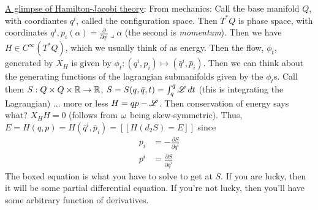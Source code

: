  \underline{A glimpse of Hamilton-Jacobi theory}:  From mechanics:
 Call the base manifold $Q$, with coordiantes $q^i$, called the
 configuration space.  Then $T^*Q$ is phase space, with
 coordinates $q^i, p_i(\alpha) = \frac{\partial}{\partial
 q^i}\lrcorner \alpha$ (the second is \emph{momentum}).  Then we
 have $H\in C^\infty(T^*Q)$, which we usually think of as energy.
 Then the flow, $\phi_t$, generated by $X_H$ is given by
 $\phi_t:(q^i,p_i)\mapsto (\bar q^i,\bar p_i)$.  Then we can think
 about the generating functions of the lagrangian submanifolds
 given by the $\phi_t$s.  Call them $S:Q\times Q\times \mathbb{R}\to
 \mathbb{R}$, $S=S(q,\bar q,t) = \int_q^{\bar q} \mathscr{L}\, dt$ (this is
 integrating the Lagrangian) ... more or less $H=qp-\mathscr{L}$.  Then
 conservation of energy says what?  $X_H H=0$
 (follows from $\omega$ being skew-symmetric). Thus, $E=H(q,p) = H(\bar q^i,\bar
 p_i) = [[H(d_2S)=E]]$ since
 \begin{align*}
   p_i &= -\frac{\partial S}{\partial q^i}\\
   \bar p^i &= \frac{\partial S}{\partial \bar q^i}
 \end{align*}
 The boxed equation is what you have to solve to get at $S$.  If
 you are lucky, then it will be some partial differential
 equation.  If you're not lucky, then you'll have some arbitrary
 function of derivatives.
